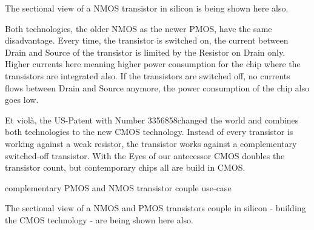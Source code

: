 The sectional view of a \gls{NMOS} transistor in silicon is being shown here also.

Both technologies, the older \gls{NMOS} as the newer \gls{PMOS}, have the same disadvantage. Every time, the transistor is switched on, the current between Drain and Source of the transistor is limited by the Resistor on Drain only. Higher currents here meaning higher power consumption for the chip where the transistors are integrated also. If the transistors are switched off, no currents flows between Drain and Source anymore, the power consumption of the chip also goes low.

Et violà, the US-Patent with Number 3356858\footnotemark changed the world and combines both technologies to the new \gls{CMOS} technology. Instead of every transistor is working against a weak resistor, the transistor works against a complementary switched-off transistor. With the Eyes of our antecessor \gls{CMOS} doubles the transistor count, but contemporary chips all are build in \gls{CMOS}.

\begin{center}
    complementary \gls{PMOS} and \gls{NMOS} transistor couple use-case
    \begin{figure}[h] %
        \centering
        \begin{circuitdiagram}{20}{20}
        \end{circuitdiagram}
    \end{figure}
\end{center}

The sectional view of a \gls{NMOS} and \gls{PMOS} transistors couple in silicon - building the \gls{CMOS} technology - are being shown here also.

